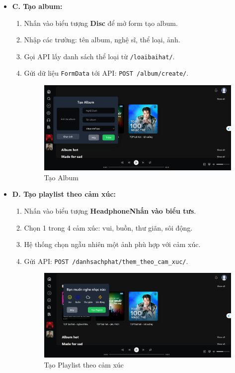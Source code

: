 \begin{itemize}
  \item \textbf{C. Tạo album:}
  \begin{enumerate}
    \item Nhấn vào biểu tượng \textbf{Disc} để mở form tạo album.
    \item Nhập các trường: tên album, nghệ sĩ, thể loại, ảnh.
    \item Gọi API lấy danh sách thể loại từ \texttt{/loaibaihat/}.
    \item Gửi dữ liệu \texttt{FormData} tới API: \texttt{POST /album/create/}.
    \begin{figure}[H]
        \centering
        \includegraphics[width=1\textwidth]{imgs/trienkhaife/creatAlbum.png}
        \caption{Tạo Album}
      \end{figure}
  \end{enumerate}

  \item \textbf{D. Tạo playlist theo cảm xúc:}
  \begin{enumerate}
    \item Nhấn vào biểu tượng \textbf{HeadphoneNhấn vào biểu tưs}.
    \item Chọn 1 trong 4 cảm xúc: vui, buồn, thư giãn, sôi động.
    \item Hệ thống chọn ngẫu nhiên một ảnh phù hợp với cảm xúc.
    \item Gửi API: \texttt{POST /danhsachphat/them\_theo\_cam\_xuc/}.
    \begin{figure}[H]
        \centering
        \includegraphics[width=1\textwidth]{imgs/trienkhaife/camxuc.png}
        \caption{Tạo Playlist theo cảm xúc}
      \end{figure}
  \end{enumerate}

\end{itemize}
